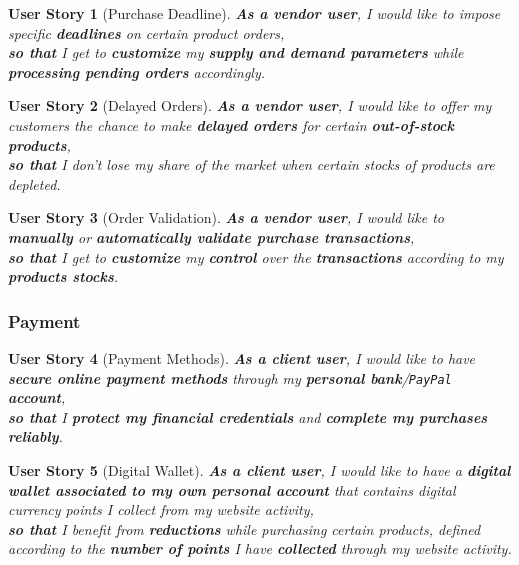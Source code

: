 \documentclass[a4paper,12pt]{book}
\theoremstyle{break}
\newtheorem{userStory}{User Story}
\theoremstyle{break}
\theoremstyle{break}
\theoremstyle{break}
\theoremstyle{definition}
\theoremstyle{remark}
\begin{document}
\begin{userStory}[Purchase Deadline]
\textbf{As a {\color{red} vendor} user}, I would like to impose specific \textbf{deadlines} on certain product orders,\\
\indent
\textbf{so that} I get to \textbf{customize} my \textbf{supply and demand parameters} while \textbf{processing pending orders} accordingly.
\end{userStory}

\begin{userStory}[Delayed Orders]
\textbf{As a {\color{red} vendor} user}, I would like to offer my customers the chance to make \textbf{delayed orders} for certain \textbf{out-of-stock products},\\
\indent
\textbf{so that} I don't lose my share of the market when certain stocks of products are depleted.
\end{userStory}

\begin{userStory}[Order Validation]
\textbf{As a {\color{red} vendor} user}, I would like to \textbf{manually} or \textbf{automatically validate purchase transactions},\\
\indent
\textbf{so that} I get to \textbf{customize} my \textbf{control} over the \textbf{transactions} according to my \textbf{products stocks}.
\end{userStory}

\subsubsection{Payment}
\begin{userStory}[Payment Methods]
\textbf{As a {\color{green} client} user}, I would like to have \textbf{secure online payment methods} through my \textbf{personal bank}/\texttt{PayPal} \textbf{account},\\
\indent
\textbf{so that} I \textbf{protect my financial credentials} and \textbf{complete my purchases reliably}.
\end{userStory}

\begin{userStory}[Digital Wallet]
\textbf{As a {\color{green} client} user}, I would like to have a \textbf{digital wallet associated to my own personal account} that contains digital currency points I collect from my website activity,\\
\indent
\textbf{so that} I benefit from \textbf{reductions} while purchasing certain products, defined according to the \textbf{number of points} I have \textbf{collected} through my website activity.
\end{userStory}
\end{document}
